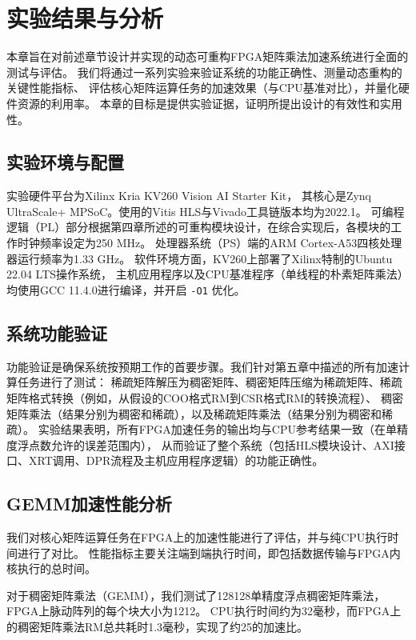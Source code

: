 \chapter{实验结果与分析}

本章旨在对前述章节设计并实现的动态可重构FPGA矩阵乘法加速系统进行全面的测试与评估。
我们将通过一系列实验来验证系统的功能正确性、测量动态重构的关键性能指标、
评估核心矩阵运算任务的加速效果（与CPU基准对比），并量化硬件资源的利用率。
本章的目标是提供实验证据，证明所提出设计的有效性和实用性。

\section{实验环境与配置}

实验硬件平台为Xilinx Kria KV260 Vision AI Starter Kit，
其核心是Zynq UltraScale+ MPSoC。使用的Vitis HLS与Vivado工具链版本均为2022.1。
可编程逻辑（PL）部分根据第四章所述的可重构模块设计，在综合实现后，各模块的工作时钟频率设定为250 MHz。
处理器系统（PS）端的ARM Cortex-A53四核处理器运行频率为1.33 GHz。
软件环境方面，KV260上部署了Xilinx特制的Ubuntu 22.04 LTS操作系统，
主机应用程序以及CPU基准程序（单线程的朴素矩阵乘法）均使用GCC 11.4.0进行编译，并开启 \verb|-O1| 优化。

\section{系统功能验证}

功能验证是确保系统按预期工作的首要步骤。我们针对第五章中描述的所有加速计算任务进行了测试：
稀疏矩阵解压为稠密矩阵、稠密矩阵压缩为稀疏矩阵、稀疏矩阵格式转换（例如，从假设的COO格式RM到CSR格式RM的转换流程）、
稠密矩阵乘法（结果分别为稠密和稀疏），以及稀疏矩阵乘法（结果分别为稠密和稀疏）。
实验结果表明，所有FPGA加速任务的输出均与CPU参考结果一致（在单精度浮点数允许的误差范围内），
从而验证了整个系统（包括HLS模块设计、AXI接口、XRT调用、DPR流程及主机应用程序逻辑）的功能正确性。

\section{GEMM加速性能分析}

我们对核心矩阵运算任务在FPGA上的加速性能进行了评估，并与纯CPU执行时间进行了对比。
性能指标主要关注端到端执行时间，即包括数据传输与FPGA内核执行的总时间。

对于稠密矩阵乘法（GEMM），我们测试了128\texttimes{}128单精度浮点稠密矩阵乘法，FPGA上脉动阵列的每个块大小为12\texttimes{}12。
CPU执行时间约为32毫秒，而FPGA上的稠密矩阵乘法RM总共耗时1.3毫秒，实现了约25\texttimes{}的加速比。

